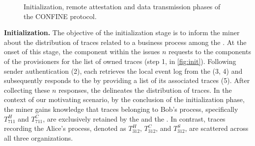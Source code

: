 \begin{figure}[t]
	\hfill
	\hfill
	\hfill
	\caption{Initialization, remote attestation and data transmission phases of the CONFINE protocol.}
	\label{fig:workflow}
\end{figure}
\textbf{Initialization.} The objective of the initialization stage is to inform the miner about the distribution of traces related to a business process among the . At the onset of this stage, the  component within the  issues $n$ requests to the  components of the provisioners for the list of owned traces (step 1, in \cref{fig:init}). Following sender authentication (2), each  retrieves the local event log from the  (3, 4) and subsequently responds to the  by providing a list of its associated traces (5). After collecting these $n$ responses, the  delineates the distribution of traces. In the context of our motivating scenario, by the conclusion of the initialization phase, the miner gains knowledge that traces belonging to Bob's process, specifically $T^H_{711}$ and $T^C_{711}$, are exclusively retained by the  and the . In contrast, traces recording the Alice's process, denoted as $T^H_{312}$, $T^C_{312}$, and $T^S_{312}$, are scattered across all three organizations.


